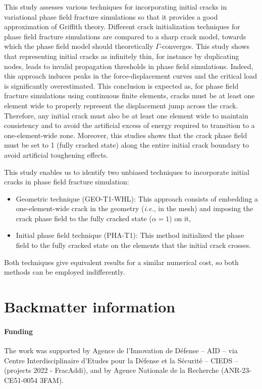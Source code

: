 \documentclass[OptSoft]{jtcam_preprint}
\begin{document}
This study assesses various techniques for incorporating initial cracks in variational phase field fracture simulations so that it provides a good approximation of Griffith theory.
Different crack initialization techniques for phase field fracture simulations are compared to a sharp crack model, towards which the phase field model should theoretically $\Gamma$-converges.
This study shows that representing initial cracks as infinitely thin, for instance by duplicating nodes, leads to invalid propagation thresholds in phase field simulations.
Indeed, this approach induces peaks in the force-displacement curves and the critical load is significantly overestimated.
This conclusion is expected as, for phase field fracture simulations using continuous finite elements, cracks must be at least one element wide to properly represent the displacement jump across the crack.
Therefore, any initial crack must also be at least one element wide to maintain consistency and to avoid the artificial excess of energy required to transition to a one-element-wide zone.
Moreover, this studies shows that the crack phase field must be set to 1 (fully cracked state) along the entire initial crack boundary to avoid artificial toughening effects.

This study enables us to identify two unbiased techniques to incorporate initial cracks in phase field fracture simulation:
\begin{itemize}
  \item Geometric technique (GEO-T1-WHL): This approach consists of embedding a one-element-wide crack in the geometry (\emph{i.e.}, in the mesh) and imposing the crack phase field to the fully cracked state ($\alpha=1$) on it,
  \item Initial phase field technique (PHA-T1): This method initialized the phase field to the fully cracked state on the elements that the initial crack crosses.
\end{itemize}
Both techniques give equivalent results for a similar numerical cost, so both methods can be employed indifferently.


\section*{Backmatter information}

\paragraph{Funding}
The work was supported by Agence de l'Innovation de Défense -- AID -- via Centre Interdisciplinaire d'Etudes pour la Défense et la Sécurité -- CIEDS -- (projects 2022 - FracAddi), and by Agence Nationale de la Recherche (ANR-23-CE51-0054 3FAM).
\end{document}

